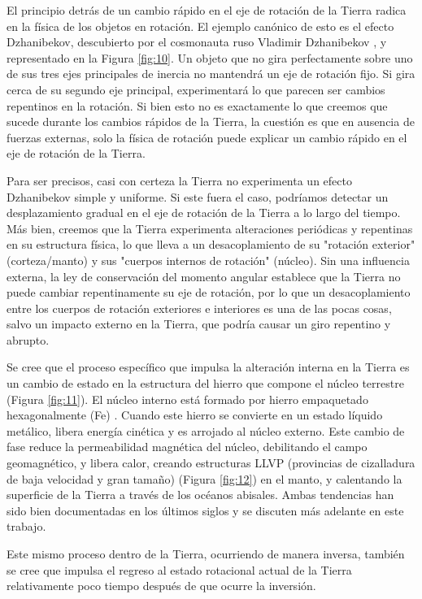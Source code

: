\documentclass[10pt,twocolumn,letterpaper]{article}
\begin{document}
El principio detrás de un cambio rápido en el eje de rotación de la Tierra radica en la física de los objetos en rotación. El ejemplo canónico de esto es el efecto Dzhanibekov, descubierto por el cosmonauta ruso Vladimir Dzhanibekov \cite{37}, y representado en la Figura \ref{fig:10}. Un objeto que no gira perfectamente sobre uno de sus tres ejes principales de inercia no mantendrá un eje de rotación fijo. Si gira cerca de su segundo eje principal, experimentará lo que parecen ser cambios repentinos en la rotación. Si bien esto no es exactamente lo que creemos que sucede durante los cambios rápidos de la Tierra, la cuestión es que en ausencia de fuerzas externas, solo la física de rotación puede explicar un cambio rápido en el eje de rotación de la Tierra.

Para ser precisos, casi con certeza la Tierra no experimenta un efecto Dzhanibekov simple y uniforme. Si este fuera el caso, podríamos detectar un desplazamiento gradual en el eje de rotación de la Tierra a lo largo del tiempo. Más bien, creemos que la Tierra experimenta alteraciones periódicas y repentinas en su estructura física, lo que lleva a un desacoplamiento de su "rotación exterior" (corteza/manto) y sus "cuerpos internos de rotación" (núcleo). Sin una influencia externa, la ley de conservación del momento angular establece que la Tierra no puede cambiar repentinamente su eje de rotación, por lo que un desacoplamiento entre los cuerpos de rotación exteriores e interiores es una de las pocas cosas, salvo un impacto externo en la Tierra, que podría causar un giro repentino y abrupto.

Se cree que el proceso específico que impulsa la alteración interna en la Tierra es un cambio de estado en la estructura del hierro que compone el núcleo terrestre (Figura \ref{fig:11}). El núcleo interno está formado por hierro empaquetado hexagonalmente (Fe) \cite{141}. Cuando este hierro se convierte en un estado líquido metálico, libera energía cinética y es arrojado al núcleo externo. Este cambio de fase reduce la permeabilidad magnética del núcleo, debilitando el campo geomagnético, y libera calor, creando estructuras LLVP (provincias de cizalladura de baja velocidad y gran tamaño) (Figura \ref{fig:12}) \cite{38} en el manto, y calentando la superficie de la Tierra a través de los océanos abisales. Ambas tendencias han sido bien documentadas en los últimos siglos y se discuten más adelante en este trabajo.

Este mismo proceso dentro de la Tierra, ocurriendo de manera inversa, también se cree que impulsa el regreso al estado rotacional actual de la Tierra relativamente poco tiempo después de que ocurre la inversión.
\end{document}
